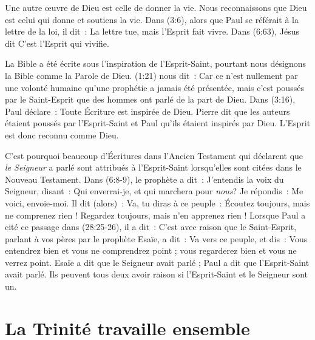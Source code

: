 Une autre œuvre de Dieu est celle de donner la vie. Nous reconnaissons que Dieu
 est celui qui donne et soutiens la vie.
 Dans (3:6), alors que Paul se référait à la lettre de la loi,
 il dit~: \og La lettre tue, mais l'Esprit fait vivre. \fg{}
 Dans (6:63), Jésus dit \og C'est l'Esprit qui vivifie.\fg{}

La Bible a été écrite sous l'inspiration de l'Esprit-Saint, pourtant nous
 désignons la Bible comme la Parole de Dieu.
 (1:21) nous dit~:
 \og Car ce n'est nullement par une volonté humaine qu'une prophétie a jamais
 été présentée, mais c'est poussés par le Saint-Esprit que des hommes ont parlé
 de la part de Dieu. \fg{}
 Dans (3:16), Paul déclare~:
 \og Toute Écriture est inspirée de Dieu. \fg{}
 Pierre dit que les auteurs étaient poussés par l'Esprit-Saint et Paul qu'ils
 étaient inspirés par Dieu. L'Esprit est donc reconnu comme Dieu.

C'est pourquoi beaucoup d'Écritures dans l'Ancien Testament qui déclarent que
 \emph{le Seigneur} a parlé sont attribués à l'Esprit-Saint lorsqu'elles sont citées
 dans le Nouveau Testament.
 Dans (6:8-9), le prophète a dit~: \og J'entendis la voix du
 Seigneur, disant~: Qui enverrai-je, et qui marchera pour \emph{nous}? Je répondis~:
 Me voici, envoie-moi. Il dit (alors)~: Va, tu diras à ce peuple~:
 Écoutez toujours, mais ne comprenez rien ! Regardez toujours, mais n'en
 apprenez rien ! \fg{}
 Lorsque Paul a cité ce passage dans (28:25-26), il a dit~:
 \og C'est avec raison que le Saint-Esprit, parlant à vos pères par le
 prophète Esaïe, a dit~: Va vers ce peuple, et dis~: Vous entendrez bien et
 vous ne comprendrez point ; vous regarderez bien et vous ne verrez point. \fg{}
 Esaïe a dit que le Seigneur avait parlé ; Paul a dit que l'Esprit-Saint
 avait parlé.
 Ils peuvent tous deux avoir raison si l'Esprit-Saint et le Seigneur sont un.


\section*{La Trinité travaille ensemble}

